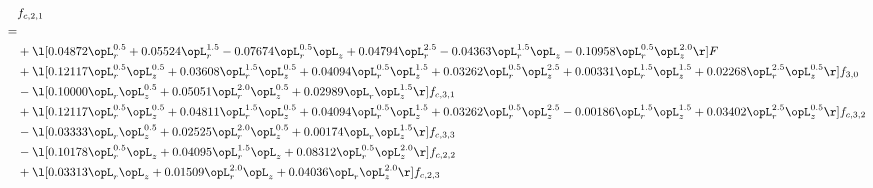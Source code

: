 \begin{alignat}{2} 
\label{eq:f_21_2} 
& f_{c,2,1} \nonumber \\ 
 = \\ 
& + \l[  0.04872 \opL_r^{0.5} +  0.05524 \opL_r^{1.5}   -0.07674 \opL_r^{0.5} \opL_z +  0.04794 \opL_r^{2.5}   -0.04363 \opL_r^{1.5} \opL_z   -0.10958 \opL_r^{0.5} \opL_z^{2.0}  \r] F \nonumber \\ 
& + \l[  0.12117 \opL_r^{0.5} \opL_z^{0.5} +  0.03608 \opL_r^{1.5} \opL_z^{0.5} +  0.04094 \opL_r^{0.5} \opL_z^{1.5} +  0.03262 \opL_r^{0.5} \opL_z^{2.5} +  0.00331 \opL_r^{1.5} \opL_z^{1.5} +  0.02268 \opL_r^{2.5} \opL_z^{0.5}  \r] f_{3,0} \nonumber \\ 
& - \l[  0.10000 \opL_r \opL_z^{0.5} +  0.05051 \opL_r^{2.0} \opL_z^{0.5} +  0.02989 \opL_r \opL_z^{1.5}  \r] f_{c,3,1} \nonumber \\ 
& + \l[  0.12117 \opL_r^{0.5} \opL_z^{0.5} +  0.04811 \opL_r^{1.5} \opL_z^{0.5} +  0.04094 \opL_r^{0.5} \opL_z^{1.5} +  0.03262 \opL_r^{0.5} \opL_z^{2.5}   -0.00186 \opL_r^{1.5} \opL_z^{1.5} +  0.03402 \opL_r^{2.5} \opL_z^{0.5}  \r] f_{c,3,2} \nonumber \\ 
& - \l[  0.03333 \opL_r \opL_z^{0.5} +  0.02525 \opL_r^{2.0} \opL_z^{0.5} +  0.00174 \opL_r \opL_z^{1.5}  \r] f_{c,3,3} \nonumber \\ 
& - \l[  0.10178 \opL_r^{0.5} \opL_z +  0.04095 \opL_r^{1.5} \opL_z +  0.08312 \opL_r^{0.5} \opL_z^{2.0}  \r] f_{c,2,2} \nonumber \\ 
& + \l[  0.03313 \opL_r \opL_z +  0.01509 \opL_r^{2.0} \opL_z +  0.04036 \opL_r \opL_z^{2.0}  \r] f_{c,2,3} \nonumber \\ 
\end{alignat} 


